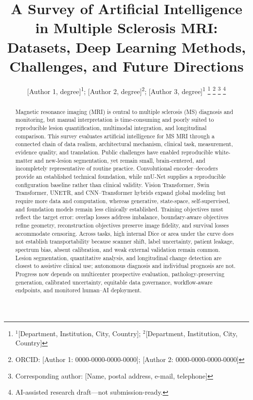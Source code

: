 \documentclass[journal,twoside,web]{ieeecolor}
\begin{document}
\title{A Survey of Artificial Intelligence in Multiple Sclerosis MRI: Datasets, Deep Learning Methods, Challenges, and Future Directions}
\author{[Author 1, degree]\textsuperscript{1}; [Author 2, degree]\textsuperscript{2}; [Author 3, degree]\textsuperscript{1}
\thanks{$^{1}$[Department, Institution, City, Country]; $^{2}$[Department, Institution, City, Country]}
\thanks{ORCID: [Author 1: 0000-0000-0000-0000]; [Author 2: 0000-0000-0000-0000]}
\thanks{Corresponding author: [Name, postal address, e-mail, telephone]}
\thanks{AI-assisted research draft---not submission-ready.}}
\maketitle
\pagestyle{headings}

\begin{abstract}
Magnetic resonance imaging (MRI) is central to multiple sclerosis (MS) diagnosis and monitoring, but manual interpretation is time-consuming and poorly suited to reproducible lesion quantification, multimodal integration, and longitudinal comparison. This survey evaluates artificial intelligence for MS MRI through a connected chain of data realism, architectural mechanism, clinical task, measurement, evidence quality, and translation. Public challenges have enabled reproducible white-matter and new-lesion segmentation, yet remain small, brain-centered, and incompletely representative of routine practice. Convolutional encoder--decoders provide an established technical foundation, while nnU-Net supplies a reproducible configuration baseline rather than clinical validity. Vision Transformer, Swin Transformer, UNETR, and CNN--Transformer hybrids expand global modeling but require more data and computation, whereas generative, state-space, self-supervised, and foundation models remain less clinically established. Training objectives must reflect the target error: overlap losses address imbalance, boundary-aware objectives refine geometry, reconstruction objectives preserve image fidelity, and survival losses accommodate censoring. Across tasks, high internal Dice or area under the curve does not establish transportability because scanner shift, label uncertainty, patient leakage, spectrum bias, absent calibration, and weak external validation remain common. Lesion segmentation, quantitative analysis, and longitudinal change detection are closest to assistive clinical use; autonomous diagnosis and individual prognosis are not. Progress now depends on multicenter prospective evaluation, pathology-preserving generation, calibrated uncertainty, equitable data governance, workflow-aware endpoints, and monitored human--AI deployment.
\end{abstract}
\end{document}

